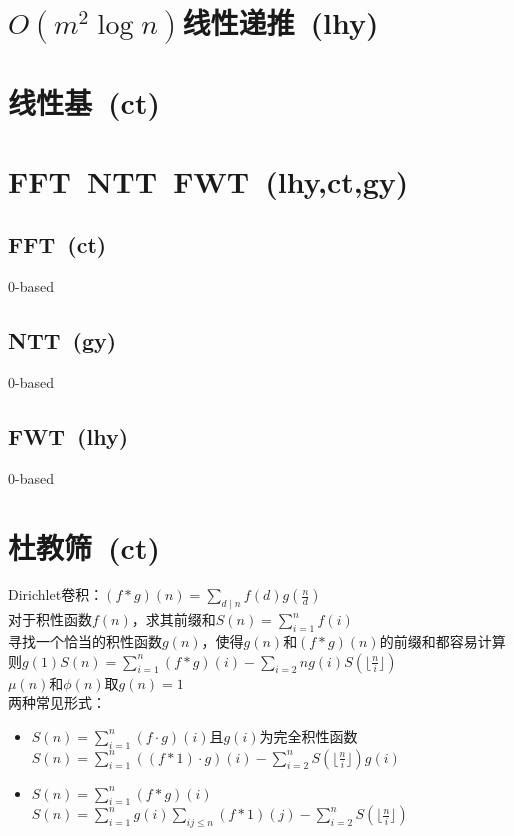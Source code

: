 \section{$ O(m ^ 2 \log n) $线性递推\ \small(lhy)}
\section{线性基\ \small(ct)}
\section{FFT\ NTT\ FWT\ \small(lhy,ct,gy)}
	\subsection*{FFT\ \small(ct)}
		$ 0 $-based
	\subsection*{NTT\ \small(gy)}
		$ 0 $-based
	\subsection*{FWT\ \small(lhy)}
		$ 0 $-based
\section{杜教筛\ \small(ct)}
	Dirichlet卷积：$ (f \ast g) (n) = \sum\limits_{d \mid n}^{} f(d) g(\frac{n}{d}) $
	\\对于积性函数$ f(n) $，求其前缀和$ S(n) = \sum\limits_{i = 1}^{n} f(i) $
	\\寻找一个恰当的积性函数$ g(n) $，使得$ g(n) $和$ (f \ast g) (n) $的前缀和都容易计算
	\\则$ g(1) S(n) = \sum\limits_{i = 1}^{n} (f \ast g) (i) - \sum\limits_{i = 2}{n} g(i) S(\lfloor \frac{n}{i} \rfloor) $
	\\$ \mu (n) $和$ \phi (n) $取$ g(n) = 1 $
	\\两种常见形式：
	\begin{itemize}[nosep,wide=0pt]
		\item $ S(n) = \sum\limits_{i = 1}^{n} (f \cdot g) (i) $且$ g(i) $为完全积性函数
			\\$ S(n) = \sum\limits_{i = 1}^{n} ((f \ast 1) \cdot g) (i) - \sum\limits_{i = 2}^{n} S(\lfloor \frac{n}{i} \rfloor) g(i) $
		\item $ S(n) = \sum\limits_{i = 1}^{n} (f \ast g) (i) $
			\\$ S(n) = \sum\limits_{i = 1}^{n} g (i) \sum\limits_{ij \leq n}^{} (f \ast 1) (j) - \sum\limits_{i = 2}^{n} S(\lfloor \frac{n}{i} \rfloor) $
	\end{itemize}
